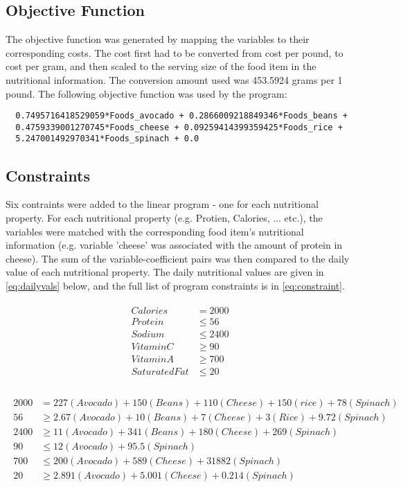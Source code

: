 \documentclass[paper=a4, fontsize=11pt]{scrartcl}
\numberwithin{equation}{section}		%
\numberwithin{figure}{section}			%
\numberwithin{table}{section}				%
\begin{document}
\subsection{Objective Function}
The objective function was generated by mapping the variables to their corresponding costs. The cost first had to be converted from cost per pound, to cost per gram, and then scaled to the serving size of the food item in the nutritional information. The conversion amount used was 453.5924 grams per 1 pound. The following objective function was used by the program: 

\begin{lstlisting}
  0.7495716418529059*Foods_avocado + 0.2866009218849346*Foods_beans +
  0.4759339001270745*Foods_cheese + 0.09259414399359425*Foods_rice +
  5.247001492970341*Foods_spinach + 0.0
\end{lstlisting}


\subsection{Constraints}
Six contraints were added to the linear program - one for each nutritional property. For each nutritional property (e.g. Protien, Calories, ... etc.), the variables were matched with the corresponding food item's nutritional information (e.g. variable 'cheese' was associated with the amount of protein in cheese). The sum of the variable-coefficient pairs was then compared to the daily value of each nutritional property. The daily nutritional values are given in \eqref{eq:dailyvals} below, and the full list of program constraints is in \eqref{eq:constraint}.

\begin{align}
  \begin{split}
    Calories &= 2000\\
    Protein &\le 56 \\
    Sodium &\le 2400 \\
    Vitamin C &\ge 90 \\
    Vitamin A &\ge 700\\
    Saturated Fat &\le 20\\
  \end{split}
  \label{eq:dailyvals}
\end{align}


\begin{align} 
	\begin{split}
      2000 &= 227(Avocado) + 150(Beans) + 110(Cheese) + 150(rice) + 78(Spinach)\\
      56 &\ge 2.67(Avocado) + 10(Beans) + 7(Cheese) + 3(Rice) + 9.72(Spinach)\\
      2400 &\ge 11(Avocado) + 341(Beans) + 180(Cheese) + 269(Spinach)\\
      90 &\le 12(Avocado) + 95.5(Spinach)\\
      700 &\le 200(Avocado) + 589(Cheese) + 31882(Spinach)\\
      20 &\ge 2.891(Avocado) + 5.001(Cheese) + 0.214(Spinach)\\
	\end{split}
    \label{eq:constraint}
\end{align}
\end{document}
